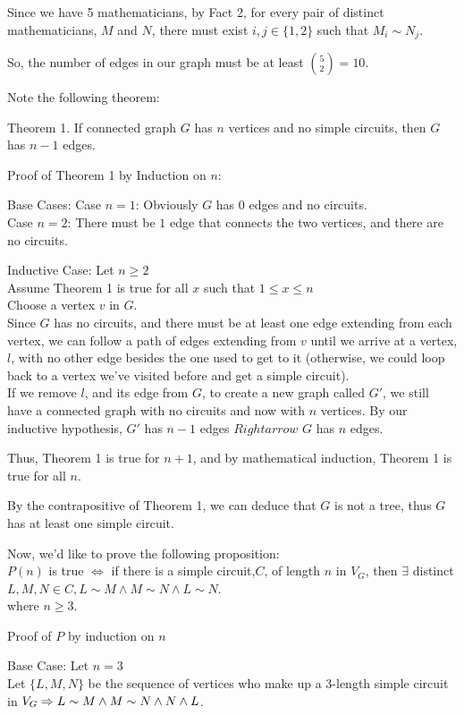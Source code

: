 \documentclass[fleqn]{article}
\begin{document}
Since we have 5 mathematicians, by Fact 2, for every pair of distinct mathematicians, $M$ and $N$, there must exist $i,j \in \lbrace 1,2 \rbrace$ such that $M_i \sim N_j$.

So, the number of edges in our graph must be at least ${5 \choose 2} = 10$.

Note the following theorem:

Theorem 1.
If connected graph $G$ has $n$ vertices and no simple circuits,
then $G$ has $n-1$ edges.

Proof of Theorem 1 by Induction on $n$:

Base Cases:
Case $n = 1$: Obviously $G$ has 0 edges and no circuits.\\
Case $n = 2$: There must be $1$ edge that connects the two vertices, and there are no circuits.

Inductive Case: Let $n \geq 2$\\
Assume Theorem 1 is true for all $x$ such that $1 \leq x \leq n$\\
Choose a vertex $v$ in $G$.\\
Since $G$ has no circuits, and there must be at least one edge extending from each vertex, we can follow a path of edges extending from $v$ until we arrive at a vertex, $l$,  with no other edge besides the one used to get to it (otherwise, we could loop back to a vertex we've visited before and get a simple circuit).\\
If we remove $l$, and its edge from $G$, to create a new graph called $G'$, we still have a connected graph with no circuits and now with $n$ vertices. By our inductive hypothesis, $G'$ has $n-1$ edges $Rightarrow$ $G$ has $n$ edges.

Thus, Theorem 1 is true for $n+1$, and by mathematical induction, Theorem 1 is true for all $n$.
 
By the contrapositive of Theorem 1, we can deduce that $G$ is not a tree, thus $G$ has at least one simple circuit.

Now, we'd like to prove the following proposition:\\
$P(n)$ is true $\Leftrightarrow$ if there is a simple circuit,$C$, of length $n$ in $V_G$, then $\exists$ distinct $ L,M,N \in C,
                        L \sim M \wedge M \sim N \wedge L \sim N$.\\
where $n \geq 3$.

Proof of $P$ by induction on $n$

Base Case: Let $n = 3$\\
Let $\lbrace L, M, N \rbrace$ be the sequence of vertices who make up a 3-length simple circuit in $V_G \Rightarrow\\
L \sim M \wedge M \sim N \wedge N \wedge L$.
\end{document}
